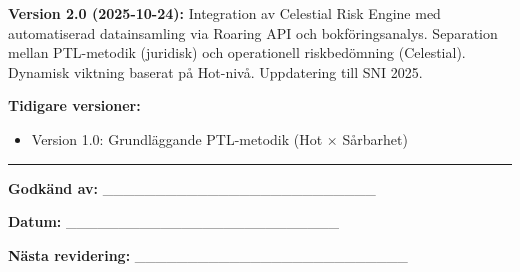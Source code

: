\documentclass{article}
\begin{document}
\textbf{Version 2.0 (2025-10-24):} Integration av Celestial Risk Engine med automatiserad datainsamling via Roaring API och bokföringsanalys. Separation mellan PTL-metodik (juridisk) och operationell riskbedömning (Celestial). Dynamisk viktning baserat på Hot-nivå. Uppdatering till SNI 2025.

\textbf{Tidigare versioner:}
\begin{itemize}
\item Version 1.0: Grundläggande PTL-metodik (Hot × Sårbarhet)
\end{itemize}

\vspace{2em}

\noindent
\rule{\textwidth}{0.4pt}

\vspace{1em}

\noindent
\textbf{Godkänd av:} \_\_\_\_\_\_\_\_\_\_\_\_\_\_\_\_\_\_\_\_\_\_\_\_\_\_

\noindent
\textbf{Datum:} \_\_\_\_\_\_\_\_\_\_\_\_\_\_\_\_\_\_\_\_\_\_\_\_\_\_

\noindent
\textbf{Nästa revidering:} \_\_\_\_\_\_\_\_\_\_\_\_\_\_\_\_\_\_\_\_\_\_\_\_\_\_
\end{document}
